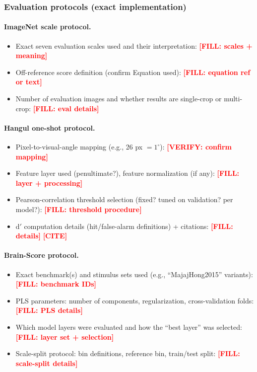 \documentclass[pdflatex,sn-nature]{sn-jnl}
\newcommand{\FILL}[1]{\textcolor{red}{\textbf{[FILL: #1]}}}
\newcommand{\CITEHERE}{\textcolor{red}{\textbf{[CITE]}}}
\newcommand{\VERIFY}[1]{\textcolor{red}{\textbf{[VERIFY: #1]}}}
\begin{document}
\subsubsection*{Evaluation protocols (exact implementation)}
\paragraph{ImageNet scale protocol.}
\begin{itemize}
    \item Exact seven evaluation scales used and their interpretation: \FILL{scales + meaning}
    \item Off-reference score definition (confirm Equation used): \FILL{equation ref or text}
    \item Number of evaluation images and whether results are single-crop or multi-crop: \FILL{eval details}
\end{itemize}

\paragraph{Hangul one-shot protocol.}
\begin{itemize}
    \item Pixel-to-visual-angle mapping (e.g., 26 px $=1^\circ$): \VERIFY{confirm mapping}
    \item Feature layer used (penultimate?), feature normalization (if any): \FILL{layer + processing}
    \item Pearson-correlation threshold selection (fixed? tuned on validation? per model?): \FILL{threshold procedure}
    \item d$'$ computation details (hit/false-alarm definitions) + citations: \FILL{details} \quad \CITEHERE
\end{itemize}

\paragraph{Brain-Score protocol.}
\begin{itemize}
    \item Exact benchmark(s) and stimulus sets used (e.g., ``MajajHong2015'' variants): \FILL{benchmark IDs}
    \item PLS parameters: number of components, regularization, cross-validation folds: \FILL{PLS details}
    \item Which model layers were evaluated and how the ``best layer'' was selected: \FILL{layer set + selection}
    \item Scale-split protocol: bin definitions, reference bin, train/test split: \FILL{scale-split details}
\end{itemize}
\end{document}
